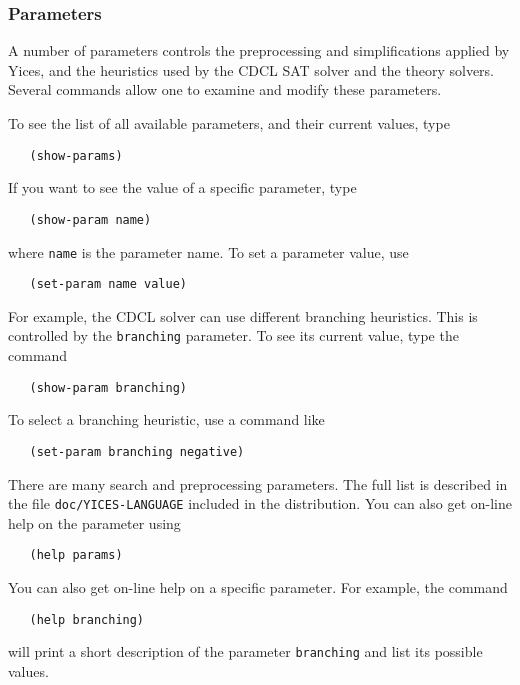 \documentclass[11pt,twoside,fleqn,openright,titlepage]{cslreport}
\begin{document}
\subsubsection*{Parameters}

A number of parameters controls the preprocessing and simplifications
applied by Yices, and the heuristics used by the CDCL SAT solver and
the theory solvers. Several commands allow one to examine and modify
these parameters.

\medskip\noindent
To see the list of all available parameters, and their current values, type
\begin{small}
\begin{verbatim}
   (show-params)
\end{verbatim}
\end{small}
If you want to see the value of a specific parameter, type
\begin{small}
\begin{verbatim}
   (show-param name)
\end{verbatim}
\end{small}
where \texttt{name} is the parameter name. To set a parameter value, use
\begin{small}
\begin{verbatim}
   (set-param name value)
\end{verbatim}
\end{small}
For example, the CDCL solver can use different branching
heuristics. This is controlled by the \texttt{branching} parameter. To
see its current value, type the command
\begin{small}
\begin{verbatim}
   (show-param branching)
\end{verbatim}
\end{small}
To select a branching heuristic, use a command like
\begin{small}
\begin{verbatim}
   (set-param branching negative)
\end{verbatim}
\end{small}

\medskip\noindent
There are many search and preprocessing parameters. The full list is
described in the file \texttt{doc/YICES-LANGUAGE} included in the
distribution. You can also get on-line help on the parameter using
\begin{small}
\begin{verbatim}
   (help params)
\end{verbatim}
\end{small}
You can also get on-line help on a specific parameter. For example,
the command
\begin{small}
\begin{verbatim}
   (help branching)
\end{verbatim}
\end{small}
will print a short description of the parameter \texttt{branching} and
list its possible values.
\end{document}
